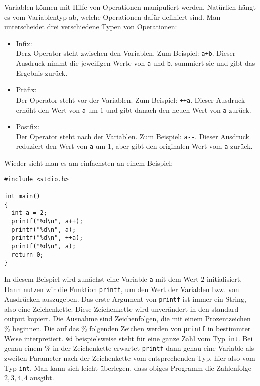 Variablen können mit Hilfe von Operationen manipuliert werden.
Natürlich hängt es vom Variablentyp ab, welche Operationen dafür definiert sind.
Man unterscheidet drei verschiedene Typen von Operationen:
\begin{itemize}
\item Infix:\\
  Derx Operator steht zwischen den Variablen. Zum Beispiel: \verb|a+b|. 
  Dieser Ausdruck nimmt die jeweiligen Werte von \verb|a| und \verb|b|, summiert sie und gibt das Ergebnis zurück.
\item Präfix:\\
  Der Operator steht vor der Variablen. Zum Beispiel: \verb|++a|. 
  Dieser Ausdruck erhöht den Wert von \verb|a| um $1$ und gibt danach den neuen Wert von \verb|a| zurück.
\item Postfix:\\
  Der Operator steht nach der Variablen. Zum Beispiel: \verb|a--|. 
  Dieser Ausdruck reduziert den Wert von \verb|a| um $1$, aber gibt den originalen Wert vom \verb|a| zurück.
\end{itemize}
Wieder sieht man es am einfachsten an einem Beispiel:
\begin{lstlisting}
#include <stdio.h>

int main()
{
  int a = 2;
  printf("%d\n", a++);
  printf("%d\n", a);
  printf("%d\n", ++a);
  printf("%d\n", a);
  return 0;
}
\end{lstlisting}
In diesem Beispiel wird zunächst eine Variable \texttt{a} mit dem Wert $2$ initialisiert. 
Dann nutzen wir die Funktion \texttt{printf}, um den Wert der Variablen bzw. von Ausdrücken auszugeben. 
Das erste Argument von \texttt{printf} ist immer ein String, also eine Zeichenkette.
Diese Zeichenkette wird unverändert in den standard output kopiert.
Die Ausnahme sind Zeichenfolgen, die mit einem Prozentzeichen \% beginnen.
Die auf das \% folgenden Zeichen werden von \texttt{printf} in bestimmter Weise interpretiert.
\verb|%d| beispielsweise steht für eine ganze Zahl vom Typ \texttt{int}. 
Bei genau einem \% in der Zeichenkette erwartet \texttt{printf} dann genau eine Variable als zweiten Parameter nach der Zeichenkette vom entsprechenden Typ, hier also vom Typ \texttt{int}.
Man kann sich leicht überlegen, dass obiges Programm die Zahlenfolge $2,3,4,4$ ausgibt.

